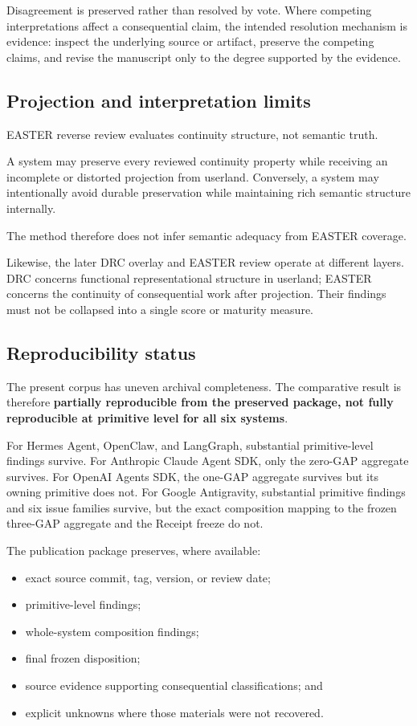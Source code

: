 \documentclass[11pt]{article}
\begin{document}
Disagreement is preserved rather than resolved by vote. Where competing interpretations affect a consequential claim, the intended resolution mechanism is evidence: inspect the underlying source or artifact, preserve the competing claims, and revise the manuscript only to the degree supported by the evidence.

\subsection{Projection and interpretation limits}

EASTER reverse review evaluates continuity structure, not semantic truth.

A system may preserve every reviewed continuity property while receiving an incomplete or distorted projection from userland. Conversely, a system may intentionally avoid durable preservation while maintaining rich semantic structure internally.

The method therefore does not infer semantic adequacy from EASTER coverage.

Likewise, the later DRC overlay and EASTER review operate at different layers. DRC concerns functional representational structure in userland; EASTER concerns the continuity of consequential work after projection. Their findings must not be collapsed into a single score or maturity measure.

\subsection{Reproducibility status}

The present corpus has uneven archival completeness. The comparative result is therefore \textbf{partially reproducible from the preserved package, not fully reproducible at primitive level for all six systems}.

For Hermes Agent, OpenClaw, and LangGraph, substantial primitive-level findings survive. For Anthropic Claude Agent SDK, only the zero-GAP aggregate survives. For OpenAI Agents SDK, the one-GAP aggregate survives but its owning primitive does not. For Google Antigravity, substantial primitive findings and six issue families survive, but the exact composition mapping to the frozen three-GAP aggregate and the Receipt freeze do not.

The publication package preserves, where available:

\begin{itemize}
\item exact source commit, tag, version, or review date;
\item primitive-level findings;
\item whole-system composition findings;
\item final frozen disposition;
\item source evidence supporting consequential classifications; and
\item explicit unknowns where those materials were not recovered.
\end{itemize}
\end{document}
